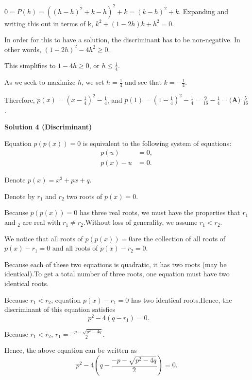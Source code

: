 \begin{enumerate}
 $0=P(h)=((h-h)^2+k-h)^2+k=(k-h)^2+k$. Expanding and writing this out in terms of k, $k^2+(1-2h)k+h^2=0$. 

 In order for this to have a solution, the discriminant has to be non-negative. In other words, $(1-2h)^2-4h^2\geq0$. 

 This simplifies to $1-4h\geq0$, or $h\leq\frac{1}{4}$. 

 As we seek to maximize $h$, we set $h=\frac{1}{4}$ and see that $k=-\frac{1}{4}$. 

 Therefore, $\tilde p(x)=\left(x-\frac{1}{4}\right)^2-\frac{1}{4}$, and $\tilde p(1)=\left(1-\frac{1}{4}\right)^2-\frac{1}{4}=\frac{9}{16}-\frac{1}{4}=\boxed{\textbf{(A) } \frac{5}{16}}$.

 



\textbf{Solution 4 (Discriminant)}

Equation $p \left( p \left( x \right) \right) = 0$ is equivalent to the following system of equations:
 \begin{align*} p \left( u \right) &= 0, \\ p \left( x \right) - u &= 0. \end{align*}


 Denote $p \left( x \right) = x^2 + p x + q$.

 Denote by $r_1$ and $r_2$ two roots of $p \left( x \right) = 0$.

 Because $p \left( p \left( x \right) \right) = 0$ has three real roots, we must have the properties that $r_1$ and $_2$ are real with $r_1 \neq r_2$.Without loss of generality, we assume $r_1 < r_2$.

 We notice that all roots of $p \left( p \left( x \right) \right) = 0$are the collection of all roots of $p \left( x \right) - r_1 = 0$ and all roots of $p \left( x \right) - r_2 = 0$.

 Because each of these two equations is quadratic, it has two roots (may be identical).To get a total number of three roots, one equation must have two identical roots.

 Because $r_1 < r_2$, equation $p \left( x \right) - r_1 = 0$  has two identical roots.Hence, the discriminant of this equation satisfies
 \[ p^2 - 4 \left( q - r_1 \right) = 0 . \hspace{1cm} \]

 Because $r_1 < r_2$, $r_1 = \frac{- p - \sqrt{p^2 - 4 q}}{2}$.

 Hence, the above equation can be written as
 \[ p^2 - 4 \left( q - \frac{- p - \sqrt{p^2 - 4 q}}{2} \right) = 0 . \]


\end{enumerate}
